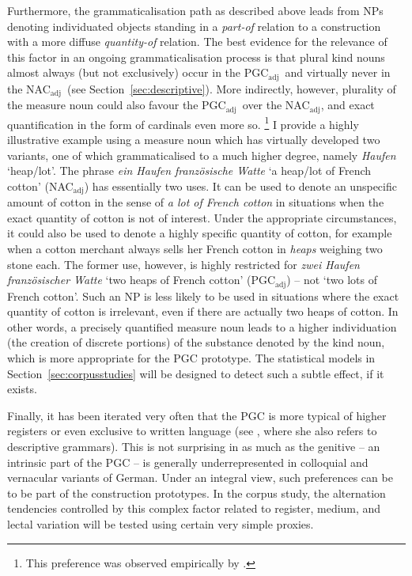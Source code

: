 \documentclass[USenglish]{article}
\newcommand{\Sub}[1]{\ensuremath{\mathrm{_{#1}}}}
\newcommand{\NACa}{NAC\Sub{adj}}
\newcommand{\PGCa}{PGC\Sub{adj}}
\begin{document}
Furthermore, the grammaticalisation path as described above leads from NPs denoting individuated objects standing in a \textit{part-of} relation to a construction with a more diffuse \textit{quantity-of} relation.
The best evidence for the relevance of this factor in an ongoing grammaticalisation process is that plural kind nouns almost always (but not exclusively) occur in the \PGCa\ and virtually never in the \NACa\ (see Section~\ref{sec:descriptive}).
More indirectly, however, plurality of the measure noun could also favour the \PGCa\ over the \NACa, and exact quantification in the form of cardinals even more so.%
\footnote{This preference was observed empirically by \cite{Hentschel1993}.}
I provide a highly illustrative example using a measure noun which has virtually developed two variants, one of which grammaticalised to a much higher degree, namely \textit{Haufen} `heap\slash lot'.
The phrase \textit{ein Haufen französische Watte} `a heap\slash lot of French cotton' (\NACa) has essentially two uses.
It can be used to denote an unspecific amount of cotton in the sense of \textit{a lot of French cotton} in situations when the exact quantity of cotton is not of interest.
Under the appropriate circumstances, it could also be used to denote a highly specific quantity of cotton, for example when a cotton merchant always sells her French cotton in \textit{heaps} weighing two stone each.
The former use, however, is highly restricted for \textit{zwei Haufen französischer Watte} `two heaps of French cotton' (\PGCa) -- not `two lots of French cotton'.
Such an NP is less likely to be used in situations where the exact quantity of cotton is irrelevant, even if there are actually two heaps of cotton.
In other words, a precisely quantified measure noun leads to a higher individuation (the creation of discrete portions) of the substance denoted by the kind noun, which is more appropriate for the PGC prototype.
The statistical models in Section~\ref{sec:corpusstudies} will be designed to detect such a subtle effect, if it exists.

Finally, it has been iterated very often that the PGC is more typical of higher registers or even exclusive to written language (see \citealp[320--323]{Hentschel1993}, where she also refers to descriptive grammars).
This is not surprising in as much as the genitive -- an intrinsic part of the PGC -- is generally underrepresented in colloquial and vernacular variants of German.
Under an integral view, such preferences can be to be part of the construction prototypes.
In the corpus study, the alternation tendencies controlled by this complex factor related to register, medium, and lectal variation will be tested using certain very simple proxies.
\end{document}
